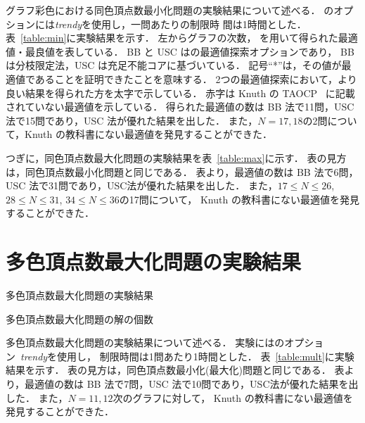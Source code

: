 グラフ彩色における同色頂点数最小化問題の実験結果について述べる．
{\clingo}のオプションには\textit{trendy}を使用し，一問あたりの制限時
間は1時間とした．
%
表~\ref{table:min}に実験結果を示す．
左からグラフの次数，
{\clingo}を用いて得られた最適値・最良値を表している．
BB と USC は{\clingo}の最適値探索オプションであり，
BB は分枝限定法，USC は充足不能コアに基づいている．
記号``*''は，その値が最適値であることを証明できたことを意味する．
2つの最適値探索において，より良い結果を得られた方を太字で示している．
赤字は Knuth の TAOCP~\cite{Knuth:TAOCP:SAT}
に記載されていない最適値を示している．
%
得られた最適値の数は BB 法で11問，USC 法で15問であり，USC 法が優れた結果を出した．
また，$N=17,18$の2問について，Knuth の教科書にない最適値を発見することができた．

つぎに，同色頂点数最大化問題の実験結果を表~\ref{table:max}に示す．
表の見方は，同色頂点数最小化問題と同じである．
表より，最適値の数は BB 法で6問，USC 法で31問であり，USC法が優れた結果を出した．
また，$17\leq N\leq 26$, $28\leq N\leq 31$, $34\leq N\leq 36$の17問について，
Knuth の教科書にない最適値を発見することができた．

\section{多色頂点数最大化問題の実験結果}

\begin{table}[htbp]
  \renewcommand{\arraystretch}{1.1}  
  \begin{minipage}[t]{0.3\linewidth}
    \centering
    \caption{多色頂点数最大化問題の実験結果}
    \label{table:mult}
  \end{minipage}
  \begin{minipage}[t]{0.65\linewidth}
    \centering
    \caption{多色頂点数最大化問題の解の個数}
    \label{table:com}
  \end{minipage}
\end{table}

多色頂点数最大化問題の実験結果について述べる．
実験には{\clingo}のオプション~\textit{trendy}を使用し，
制限時間は1問あたり1時間とした．
%
表~\ref{table:mult}に実験結果を示す．
表の見方は，同色頂点数最小化(最大化)問題と同じである．
表より，最適値の数は BB 法で7問，USC 法で10問であり，USC法が優れた結果を出した．
また，$N=11,12$次のグラフに対して，
Knuth の教科書にない最適値を発見することができた．

